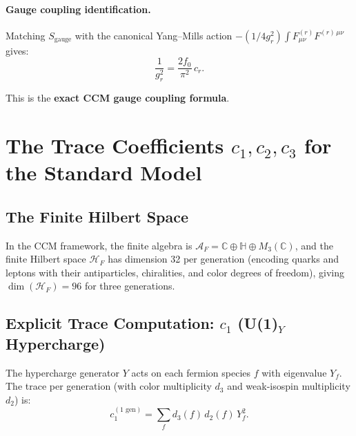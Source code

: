 \documentclass[12pt,a4paper]{article}
\begin{document}
\paragraph{Gauge coupling identification.}
Matching $S_{\mathrm{gauge}}$ with the canonical Yang--Mills action
$-(1/4g_r^2)\int F^{(r)}_{\mu\nu}F^{(r)\,\mu\nu}$ gives:
\begin{equation}\label{eq:coupling-from-trace}
\boxed{
\frac{1}{g_r^2} = \frac{2f_0}{\pi^2}\,c_r.
}
\end{equation}

This is the \textbf{exact CCM gauge coupling formula}.

\section{The Trace Coefficients $c_1, c_2, c_3$ for the Standard Model}
\label{sec:sm-traces}

\subsection{The Finite Hilbert Space}

In the CCM framework, the finite algebra is
$\mathcal{A}_F = \mathbb{C} \oplus \mathbb{H} \oplus M_3(\mathbb{C})$,
and the finite Hilbert space $\mathcal{H}_F$ has dimension 32 per generation
(encoding quarks and leptons with their antiparticles, chiralities, and
color degrees of freedom), giving $\dim(\mathcal{H}_F) = 96$ for three
generations.

\subsection{Explicit Trace Computation: $c_1$ (U(1)$_Y$ Hypercharge)}

The hypercharge generator $Y$ acts on each fermion species $f$ with
eigenvalue $Y_f$.  The trace per generation (with color multiplicity
$d_3$ and weak-isospin multiplicity $d_2$) is:
\begin{equation}\label{eq:c1-per-gen}
c_1^{(\text{1 gen})} = \sum_f d_3(f)\,d_2(f)\,Y_f^2.
\end{equation}
\end{document}
